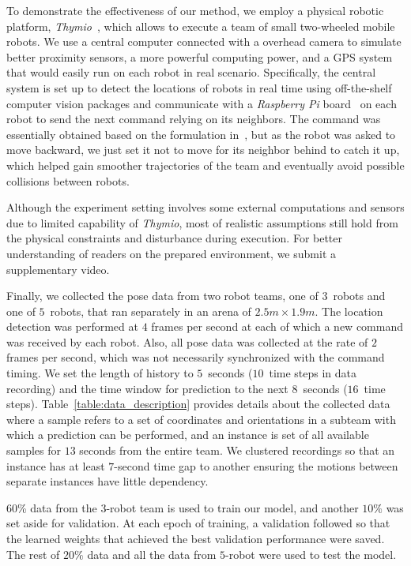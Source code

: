 \documentclass[letterpaper, 10 pt, conference]{ieeeconf}  %
\begin{document}
	To demonstrate the effectiveness of our method, we employ a physical robotic platform,
	\emph{Thymio}~\cite{Shin14}, which allows to execute a team of small two-wheeled
	mobile robots. We use a central computer connected with a overhead camera to simulate
	better proximity
	sensors, a more powerful computing power, and a GPS system that would easily run on each robot in
	real scenario.
	Specifically, the central system is set up to detect the locations of robots in real
	time using off-the-shelf computer vision packages
	and communicate with a \emph{Raspberry Pi} board~\cite{Upton14} on each robot to send
	the next command relying on its neighbors.
	The command was essentially obtained based on the formulation in~\cite{CPR17}, but
    as the robot was asked to move backward, we just set it not to move for its
	neighbor behind to catch it up, which helped gain smoother trajectories of the team
	and eventually avoid possible collisions between robots.

	Although the experiment setting involves
	some external computations and sensors due to limited capability of \emph{Thymio},
	most of realistic assumptions still hold from the physical constraints and disturbance
	during execution. For better understanding of readers on the prepared environment,
	we submit a supplementary video.

	Finally, we collected the pose data from two robot teams, one of $3$~robots and one
	of $5$~robots, that ran separately in an arena of $2.5 m \times 1.9 m$.
	The location detection was performed at $4$ frames per second at each of
	which a new command was received by each robot. Also, all pose data was
	collected at the rate of $2$ frames per second,
	which was not necessarily synchronized with the command timing.
	We set the length of history to $5$~seconds ($10$~time steps in data recording) and
	the time window for prediction to the next $8$~seconds ($16$~time steps).
	Table~\ref{table:data_description} provides details about the collected data
	where a sample refers to a set of coordinates and orientations in a subteam
	with which a prediction can be performed, and an instance is set of all available samples for $13$ seconds from the entire team. We clustered recordings so that
	an instance has at least $7$-second time gap to another ensuring
	the motions between separate instances have little dependency.

	$60$\% data from the $3$-robot team is used to train our model, and another $10\%$
	was set aside for validation. At each epoch of training, a validation followed so that
	the learned weights that achieved the best validation performance were saved.
	The rest of $20\%$ data and all the data from $5$-robot were used to test the model.
\end{document}
